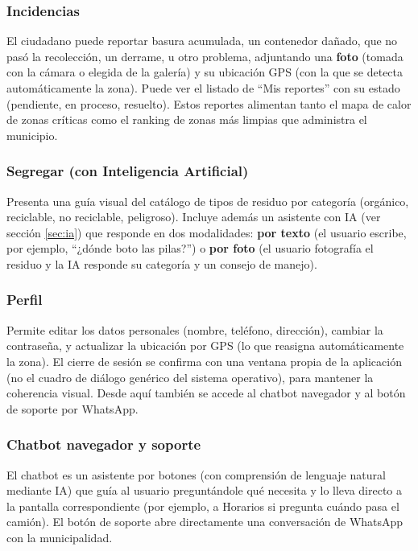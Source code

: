 \documentclass[11pt,a4paper]{article}
\begin{document}
\subsubsection{Incidencias}
El ciudadano puede reportar basura acumulada, un contenedor dañado, que no pasó la recolección, un derrame, u otro problema, adjuntando una \textbf{foto} (tomada con la cámara o elegida de la galería) y su ubicación GPS (con la que se detecta automáticamente la zona). Puede ver el listado de ``Mis reportes'' con su estado (pendiente, en proceso, resuelto). Estos reportes alimentan tanto el mapa de calor de zonas críticas como el ranking de zonas más limpias que administra el municipio.

\subsubsection{Segregar (con Inteligencia Artificial)}
Presenta una guía visual del catálogo de tipos de residuo por categoría (orgánico, reciclable, no reciclable, peligroso). Incluye además un asistente con IA (ver sección \ref{sec:ia}) que responde en dos modalidades: \textbf{por texto} (el usuario escribe, por ejemplo, ``¿dónde boto las pilas?'') o \textbf{por foto} (el usuario fotografía el residuo y la IA responde su categoría y un consejo de manejo).

\subsubsection{Perfil}
Permite editar los datos personales (nombre, teléfono, dirección), cambiar la contraseña, y actualizar la ubicación por GPS (lo que reasigna automáticamente la zona). El cierre de sesión se confirma con una ventana propia de la aplicación (no el cuadro de diálogo genérico del sistema operativo), para mantener la coherencia visual. Desde aquí también se accede al chatbot navegador y al botón de soporte por WhatsApp.

\subsubsection{Chatbot navegador y soporte}
El chatbot es un asistente por botones (con comprensión de lenguaje natural mediante IA) que guía al usuario preguntándole qué necesita y lo lleva directo a la pantalla correspondiente (por ejemplo, a Horarios si pregunta cuándo pasa el camión). El botón de soporte abre directamente una conversación de WhatsApp con la municipalidad.
\end{document}
